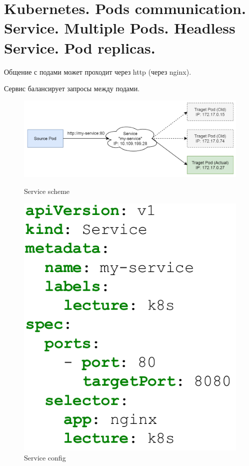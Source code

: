 \section{Kubernetes. Pods communication. Service. Multiple Pods. Headless Service. Pod replicas.}

Общение с подами может проходит через http (через nginx).

Сервис балансирует запросы между подами.

\begin{figure}[H]
	\centering
	\begin{minipage}[b]{0.4\textwidth}
		\includegraphics[width=\textwidth]{images/ssch.png}
        \caption{Service scheme}
	\end{minipage}
    \begin{minipage}[b]{0.4\textwidth}
		\includegraphics[width=\textwidth]{images/scon.png}
        \caption{Service config}
	\end{minipage}
\end{figure}

